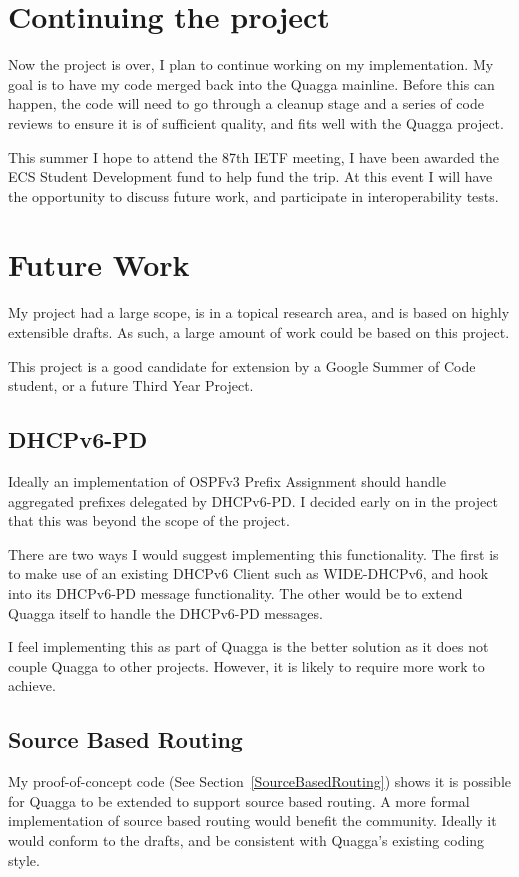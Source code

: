 \section{Continuing the project}
Now the project is over, I plan to continue working on my implementation. My
goal is to have my code merged back into the Quagga mainline. Before this can
happen, the code will need to go through a cleanup stage and a series of code
reviews to ensure it is of sufficient quality, and fits well with the Quagga
project.

This summer I hope to attend the 87th IETF meeting, I have been awarded the ECS
Student Development fund to help fund the trip. At this event I will have the
opportunity to discuss future work, and participate in interoperability tests.

\section{Future Work}
My project had a large scope, is in a topical research area, and is based on
highly extensible drafts. As such, a large amount of work could be based on
this project. 

This project is a good candidate for extension by a Google Summer of Code
student, or a future Third Year Project. 

\subsection{DHCPv6-PD}
Ideally an implementation of OSPFv3 Prefix Assignment should handle aggregated
prefixes delegated by DHCPv6-PD\@. I decided early on in the project that this
was beyond the scope of the project. 

There are two ways I would suggest implementing this functionality. The first
is to make use of an existing DHCPv6 Client such as WIDE-DHCPv6, and hook into
its DHCPv6-PD message functionality. The other would be to extend Quagga itself
to handle the DHCPv6-PD messages. 

I feel implementing this as part of Quagga is the better solution as it does
not couple Quagga to other projects. However, it is likely to require more work
to achieve.

\subsection{Source Based Routing} 
My proof-of-concept code (See Section~\ref{SourceBasedRouting}) shows it is
possible for Quagga to be extended to support source based routing. A more
formal implementation of source based routing would benefit the community.
Ideally it would conform to the drafts, and be consistent with Quagga's
existing coding style. 

